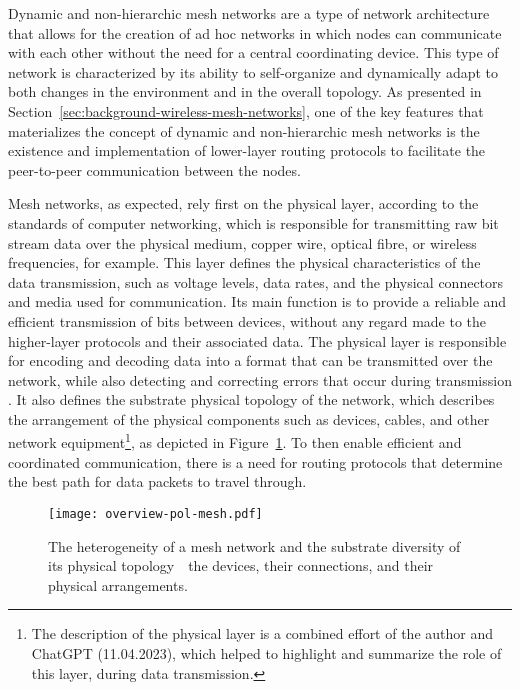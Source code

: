 Dynamic and non-hierarchic mesh networks are a type of network architecture that allows for the creation of ad hoc networks in which nodes can communicate with each other without the need for a central coordinating device. This type of network is characterized by its ability to self-organize and dynamically adapt to both changes in the environment and in the overall topology. As presented in Section~\ref{sec:background-wireless-mesh-networks}, one of the key features that materializes the concept of dynamic and non-hierarchic mesh networks is the existence and implementation of lower-layer routing protocols to facilitate the peer-to-peer communication between the nodes.

Mesh networks, as expected, rely first on the physical layer, according to the standards of computer networking, which is responsible for transmitting raw bit stream data over the physical medium, copper wire, optical fibre, or wireless frequencies, for example. This layer defines the physical characteristics of the data transmission, such as voltage levels, data rates, and the physical connectors and media used for communication. Its main function is to provide a reliable and efficient transmission of bits between devices, without any regard made to the higher-layer protocols and their associated data. The physical layer is responsible for encoding and decoding data into a format that can be transmitted over the network, while also detecting and correcting errors that occur during transmission \cite{peterson2007computer}. It also defines the substrate physical topology of the network, which describes the arrangement of the physical components such as devices, cables, and other network equipment\footnote{The description of the physical layer is a combined effort of the author and ChatGPT (11.04.2023), which helped to highlight and summarize the role of this layer, during data transmission.}, as depicted in Figure~\ref{fig:proof-of-location-overview-pol-mesh}. To then enable efficient and coordinated communication, there is a need for routing protocols that determine the best path for data packets to travel through.

\begin{figure}[h!]
    \begin{center}
    \texttt{[image: overview-pol-mesh.pdf]}
    \caption{The heterogeneity of a mesh network and the substrate diversity of its physical topology~\textemdash~the devices, their connections, and their physical arrangements.}
    \label{fig:proof-of-location-overview-pol-mesh}
    \end{center}
\end{figure}

